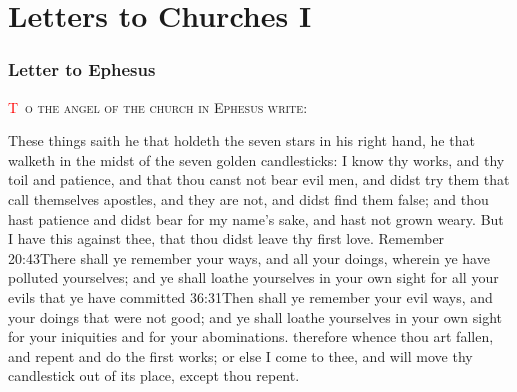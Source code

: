 \chapter{Letters to Churches I}
\subsection*{Letter to Ephesus}
\lettrine[lines=3]{\textcolor{red}{T}}{\ o the angel of the church in Ephesus write:}

\zz These things saith he that holdeth the seven stars in his right hand, he that walketh in the midst of the seven golden candlesticks:%
I know thy works, and thy toil and patience, and that thou canst not bear evil men, and didst try them that call themselves apostles, and they are not, and didst find them false; %
and thou hast patience and didst bear for my name’s sake, and hast not grown weary. %
But I have this against thee, that thou didst leave thy first love.%
Remember%
				{20:43}{There shall ye remember your ways, and all your doings, wherein ye have polluted yourselves; and ye shall loathe yourselves in your own sight for all your evils that ye have committed}%
				{36:31}{Then shall ye remember your evil ways, and your doings that were not good; and ye shall loathe yourselves in your own sight for your iniquities and for your abominations.} %
therefore whence thou art fallen, and repent and do the first works; or else I come to thee, and will move thy candlestick out of its place, except thou repent. %
